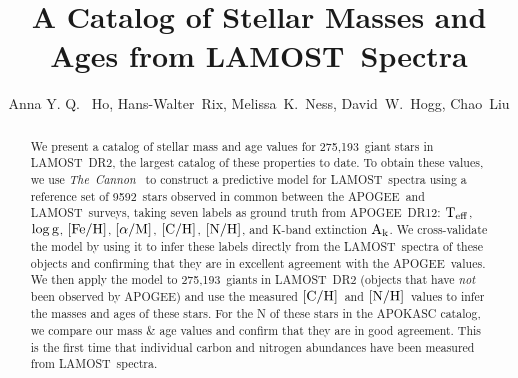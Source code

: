 \documentclass[12pt, preprint]{aastex}
\newcommand{\tc}{\textsl{The~Cannon}}
\newcommand{\apogee}{APOGEE}
\newcommand{\lamost}{LAMOST}
\newcommand{\teff}{\mbox{$\rm T_{eff}$}}
\newcommand{\logg}{\mbox{$\rm \log g$}}
\newcommand{\feh}{\mbox{$\rm [Fe/H]$}}
\newcommand{\alpham}{\mbox{$\rm [\alpha/M]$}}
\newcommand{\carbon}{\mbox{$\rm [C/H]$}}
\newcommand{\nitrogen}{\mbox{$\rm [N/H]$}}
\newcommand{\ak}{\mbox{$\rm A_k$}}
\newcommand{\ntrobj}{9592}
\newcommand{\ntestobj}{275,193}
\begin{document}
\title{A Catalog of Stellar Masses and Ages from \lamost\ Spectra}
\author{Anna Y. Q. ~Ho,
Hans-Walter~Rix,
Melissa~K.~Ness,
David~W.~Hogg, 
Chao~Liu
}


\begin{abstract}

We present a catalog of stellar mass and age values
for \ntestobj\ giant stars in \lamost\ DR2,
the largest catalog of these properties to date.
To obtain these values, we use \tc\ \citep{Ness2015}
to construct a predictive model for \lamost\ spectra 
using a reference set of \ntrobj\ stars observed in common between the \apogee\ and \lamost\ surveys,
taking seven labels as ground truth from \apogee\ DR12:
\teff, \logg, \feh, \alpham, \carbon, \nitrogen, 
and K-band extinction \ak.
We cross-validate the model by using it to infer these labels directly from the \lamost\ spectra of these objects
and confirming that they are in excellent agreement
with the \apogee\ values.
We then apply the model to \ntestobj\ giants
in \lamost\ DR2 (objects that have \emph{not} been observed by \apogee)
and use the measured \carbon\ and \nitrogen\ 
values to infer the masses and ages of these stars.
For the N of these stars in the APOKASC catalog,
we compare our mass \& age values and confirm that they
are in good agreement.
This is the first time that individual carbon and nitrogen
abundances have been measured from \lamost\ spectra.

\end{abstract}

\end{document}
